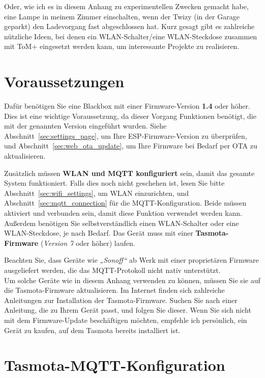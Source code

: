 Oder, wie ich es in diesem Anhang zu experimentellen Zwecken gemacht habe, eine Lampe in meinem
Zimmer einschalten, wenn der Twizy (in der Garage geparkt) den Ladevorgang fast abgeschlossen hat.
Kurz gesagt gibt es zahlreiche nützliche Ideen, bei denen ein WLAN-Schalter/eine WLAN-Steckdose
zusammen mit ToM+ eingesetzt werden kann, um interessante Projekte zu realisieren.


\section{Voraussetzungen}

Dafür benötigen Sie eine Blackbox mit einer Firmware-Version \textbf{1.4}
oder höher. Dies ist eine wichtige Voraussetzung, da dieser Vorgang Funktionen benötigt,
die mit der genannten Version eingeführt wurden. Siehe Abschnitt~\ref{sec:settings_page},
um Ihre ESP-Firmware-Version zu überprüfen, und Abschnitt~\ref{sec:web_ota_update}, um Ihre
Firmware bei Bedarf per OTA zu aktualisieren.

Zusätzlich müssen \textbf{WLAN und MQTT konfiguriert} sein, damit das gesamte System
funktioniert. Falls dies noch nicht geschehen ist, lesen Sie bitte Abschnitt~\ref{sec:wifi_settings},
um WLAN einzurichten, und Abschnitt~\ref{sec:mqtt_connection} für die MQTT-Konfiguration.
Beide müssen aktiviert und verbunden sein, damit diese Funktion verwendet werden kann.\\

Außerdem benötigen Sie selbstverständlich einen WLAN-Schalter oder eine WLAN-Steckdose,
je nach Bedarf. Das Gerät muss mit einer \textbf{Tasmota-Firmware} (\textit{Version 7} oder höher) laufen.

Beachten Sie, dass Geräte wie \textit{„Sonoff“} ab Werk mit einer proprietären Firmware ausgeliefert werden,
die das MQTT-Protokoll nicht nativ unterstützt.\\

Um solche Geräte wie in diesem Anhang verwenden zu können, müssen Sie sie auf die Tasmota-Firmware aktualisieren.
Im Internet finden sich zahlreiche Anleitungen zur Installation der Tasmota-Firmware.
Suchen Sie nach einer Anleitung, die zu Ihrem Gerät passt, und folgen Sie dieser.
Wenn Sie sich nicht mit dem Firmware-Update beschäftigen möchten, empfehle ich persönlich,
ein Gerät zu kaufen, auf dem Tasmota bereits installiert ist.


\section{Tasmota-MQTT-Konfiguration}

